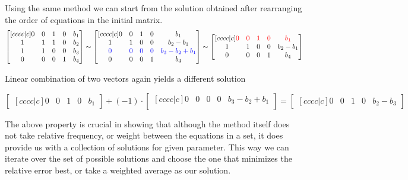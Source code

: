Using the same method we can start from the solution obtained after rearranging the order of equations in the initial matrix.
\begin{equation}
\begin{bmatrix}[cccc|c]
    0 & 0 & 1 & 0 & b_1 \\
    1 & 1 & 1 & 0 & b_2 \\ 
    1 & 1 & 0 & 0 & b_3 \\ 
    0 & 0 & 0 & 1 & b_4 \\ 
\end{bmatrix}
\sim
\begin{bmatrix}[cccc|c]
    0 & 0 & 1 & 0 & b_1 \\ 
    1 & 1 & 0 & 0 & b_2-b_1 \\ 
    \textcolor{blue}{0} & \textcolor{blue}{0} & \textcolor{blue}{0} & \textcolor{blue}{0} &\textcolor{blue}{b_3 - b_2 + b_1} \\ 
    0 & 0 & 0 & 1 & b_4
\end{bmatrix}
\sim
\begin{bmatrix}[cccc|c]
    \textcolor{red}{0} & \textcolor{red}{0} & \textcolor{red}{1} & \textcolor{red}{0} &\textcolor{red}{b_1} \\ 
    1 & 1 & 0 & 0 & b_2-b_1 \\ 
    0 & 0 & 0 & 1 & b_4
\end{bmatrix}
\end{equation}

Linear combination of two vectors again yields a different solution

\begin{equation}
\begin{bmatrix}[cccc|c]
    0 & 0 & 1 & 0 & b_1
\end{bmatrix}
+
(-1)\cdot
\begin{bmatrix}[cccc|c]
    0 & 0 & 0 & 0 & b_3 - b_2 + b_1 \\ 
\end{bmatrix}
=
\begin{bmatrix}[cccc|c]
    0 & 0 & 1 & 0 & b_2-b_3
\end{bmatrix}
\end{equation}

The above property is crucial in showing that although the method itself does not take relative frequency, or weight between the equations in a set, it does provide us with a collection of solutions for given parameter.
This way we can iterate over the set of possible solutions and choose the one that minimizes the relative error best, or take a weighted average as our solution.

